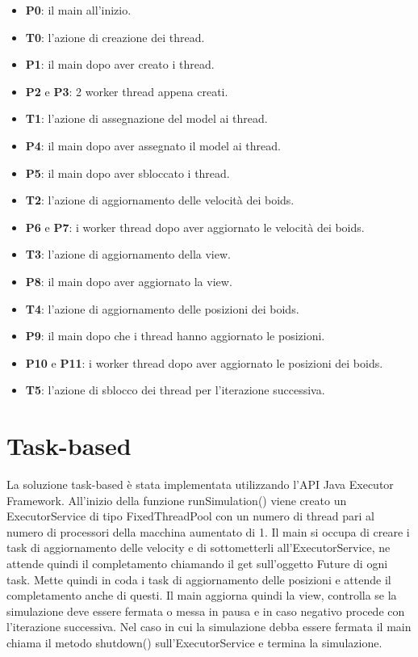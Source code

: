 \documentclass[11pt,notitlepage]{article}
\begin{document}
\begin{itemize}
    \item \textbf{P0}: il main all'inizio.
    \item \textbf{T0}: l'azione di creazione dei thread.
    \item \textbf{P1}: il main dopo aver creato i thread.
    \item \textbf{P2} e \textbf{P3}: 2 worker thread appena creati.
    \item \textbf{T1}: l'azione di assegnazione del model ai thread.
    \item \textbf{P4}: il main dopo aver assegnato il model ai thread.
    \item \textbf{P5}: il main dopo aver sbloccato i thread.
    \item \textbf{T2}: l'azione di aggiornamento delle velocità dei boids.
    \item \textbf{P6} e \textbf{P7}: i worker thread dopo aver aggiornato le velocità dei boids.
    \item \textbf{T3}: l'azione di aggiornamento della view.
    \item \textbf{P8}: il main dopo aver aggiornato la view.
    \item \textbf{T4}: l'azione di aggiornamento delle posizioni dei boids.
    \item \textbf{P9}: il main dopo che i thread hanno aggiornato le posizioni.
    \item \textbf{P10} e \textbf{P11}: i worker thread dopo aver aggiornato le posizioni dei boids.
    \item \textbf{T5}: l'azione di sblocco dei thread per l'iterazione successiva.
\end{itemize}
\newpage
\section{Task-based}
La soluzione task-based è stata implementata utilizzando l'API Java Executor Framework. All'inizio della funzione \textsf{runSimulation()} viene creato un 
\textsf{ExecutorService} di tipo \textsf{FixedThreadPool} con un numero di thread pari al numero di processori della macchina aumentato di 1.
Il main si occupa di creare i task di aggiornamento delle velocity e di sottometterli all'\textsf{ExecutorService}, ne attende quindi il completamento 
chiamando il get sull'oggetto \textsf{Future} di ogni task. Mette quindi in coda i task di aggiornamento delle posizioni e attende il completamento anche di 
questi. Il main aggiorna quindi la view, controlla se la simulazione deve essere fermata o messa in pausa e in caso negativo procede con l'iterazione successiva.
Nel caso in cui la simulazione debba essere fermata il main chiama il metodo \textsf{shutdown()} sull'\textsf{ExecutorService} e termina la simulazione.
\end{document}
